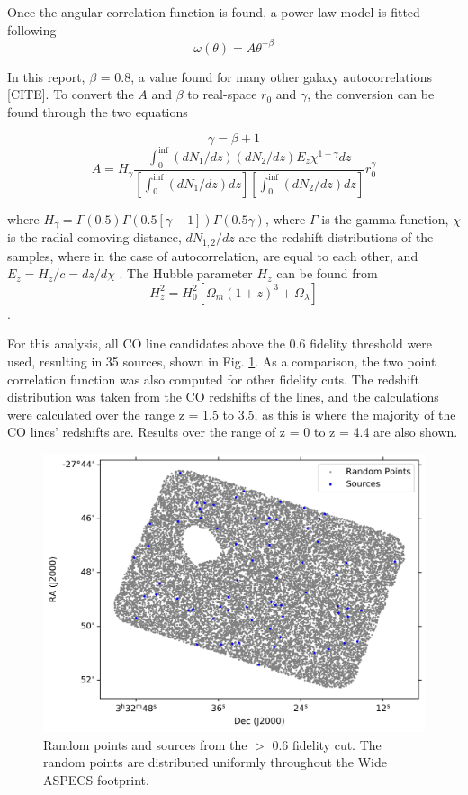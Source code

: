 Once the angular correlation function is found, a power-law model is fitted following $$\omega(\theta) = A\theta^{-\beta} $$

In this report, $\beta$ = 0.8, a value found for many other galaxy autocorrelations [CITE]. To convert the $A$ and $\beta$ to real-space $r_0$ and $\gamma$, the conversion can be found through the two equations

$$ \gamma = \beta + 1 $$ $$ A = H_{\gamma}\frac{\int_{0}^{\inf} (dN_1/dz)(dN_2/dz)E_z\chi^{1 - \gamma} dz}{[\int_{0}^{\inf} (dN_1/dz)dz][\int_{0}^{\inf} (dN_2/dz)dz]}r_0^{\gamma}$$

where $H_{\gamma} = \Gamma(0.5)\Gamma(0.5[\gamma -1])\Gamma(0.5\gamma)$, where $\Gamma$ is the gamma function, $\chi$ is the radial comoving distance, $dN_{1,2}/dz$ are the redshift distributions of the samples, where in the case of autocorrelation, are equal to each other, and $E_z = H_z/c = dz/d\chi$ \cite{hickox2011clustering}. The Hubble parameter $H_z$ can be found from
$$H_z^2 = H_0^2[\Omega_m(1+z)^3 + \Omega_{\lambda}]$$ \cite{hickox2011clustering}.

For this analysis, all CO line candidates above the 0.6 fidelity threshold were used, resulting in 35 sources, shown in Fig. \ref{fig:Clustering_points}. As a comparison, the two point correlation function was also computed for other fidelity cuts. The redshift distribution was taken from the CO redshifts of the lines, and the calculations were calculated over the range z = 1.5 to 3.5, as this is where the majority of the CO lines' redshifts are. Results over the range of z = 0 to z = 4.4 are also shown. 

\begin{figure}[tbp]
\centering \includegraphics[width=120mm]{PDFS/NX_V_Y_Sources_20000.png}
\caption{Random points and sources from the $>$ 0.6 fidelity cut. The random points are distributed uniformly throughout the Wide ASPECS footprint.}
\label{fig:Clustering_points}
\end{figure}

